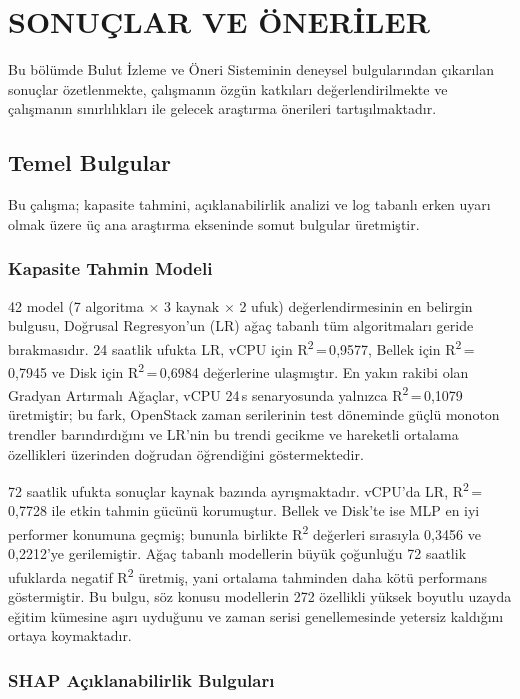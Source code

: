 \chapter{SONUÇLAR VE ÖNERİLER}
\label{ch:sonuclar}

Bu bölümde Bulut İzleme ve Öneri Sisteminin deneysel bulgularından çıkarılan sonuçlar özetlenmekte, çalışmanın özgün katkıları değerlendirilmekte ve çalışmanın sınırlılıkları ile gelecek araştırma önerileri tartışılmaktadır.


\section{Temel Bulgular}
\label{sec:sonuc-bulgular}

Bu çalışma; kapasite tahmini, açıklanabilirlik analizi ve log tabanlı erken uyarı olmak üzere üç ana araştırma ekseninde somut bulgular üretmiştir.

\subsection{Kapasite Tahmin Modeli}

42 model (7 algoritma $\times$ 3 kaynak $\times$ 2 ufuk) değerlendirmesinin en belirgin bulgusu, Doğrusal Regresyon'un (LR) ağaç tabanlı tüm algoritmaları geride bırakmasıdır.
24 saatlik ufukta LR, vCPU için R\textsuperscript{2}\,=\,0{,}9577, Bellek için R\textsuperscript{2}\,=\,0{,}7945 ve Disk için R\textsuperscript{2}\,=\,0{,}6984 değerlerine ulaşmıştır.
En yakın rakibi olan Gradyan Artırmalı Ağaçlar, vCPU 24\,s senaryosunda yalnızca R\textsuperscript{2}\,=\,0{,}1079 üretmiştir; bu fark, OpenStack zaman serilerinin test döneminde güçlü monoton trendler barındırdığını ve LR'nin bu trendi gecikme ve hareketli ortalama özellikleri üzerinden doğrudan öğrendiğini göstermektedir.

72 saatlik ufukta sonuçlar kaynak bazında ayrışmaktadır.
vCPU'da LR, R\textsuperscript{2}\,=\,0{,}7728 ile etkin tahmin gücünü korumuştur.
Bellek ve Disk'te ise MLP en iyi performer konumuna geçmiş; bununla birlikte R\textsuperscript{2} değerleri sırasıyla 0{,}3456 ve 0{,}2212'ye gerilemiştir.
Ağaç tabanlı modellerin büyük çoğunluğu 72 saatlik ufuklarda negatif R\textsuperscript{2} üretmiş, yani ortalama tahminden daha kötü performans göstermiştir.
Bu bulgu, söz konusu modellerin 272 özellikli yüksek boyutlu uzayda eğitim kümesine aşırı uyduğunu ve zaman serisi genellemesinde yetersiz kaldığını ortaya koymaktadır.

\subsection{SHAP Açıklanabilirlik Bulguları}


